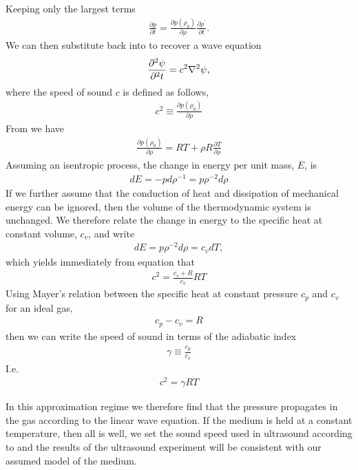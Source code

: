 Keeping only the largest terms
\begin{align}
 \frac{\partial p}{\partial t} = \frac{\partial p(\rho_0)}{\partial \rho} \frac{\partial \rho^\prime}{\partial t}.
\end{align}
We can then substitute back into \eqnref{} to recover a wave equation
\begin{align}
\frac{\partial^2 \psi}{\partial^2 t} = c^2 \nabla^2 \psi,
\end{align}
where the speed of sound $c$ is defined as follows,
\begin{align}
c^2 \equiv \frac{\partial p(\rho_0)}{\partial \rho}
\end{align}
From \eqnref{} we have
\begin{align}
   \frac{\partial p(\rho_0)}{\partial \rho} = RT + \rho R \frac{\partial T}{\partial \rho}
\end{align}
Assuming an isentropic process, the change in energy per unit mass, $E$, is 
\begin{align}
  dE = -pd\rho^{-1} = p \rho^{-2} d\rho
\end{align}
If we further assume that the conduction of heat and dissipation of mechanical energy can be ignored, 
then the volume of the thermodynamic system is unchanged.  
We therefore relate the change in energy to the specific heat at constant volume, $c_v$,  and write
\begin{align}
  dE = p \rho^{-2} d\rho = c_v dT,
\end{align}
which yields immediately from equation \eqnref{} that
\begin{align}
  c^2 = \frac{c_v + R}{c_v}RT
\end{align}
Using Mayer's relation between the specific heat at constant pressure $c_p$ and $c_v$ for an ideal gas,
\begin{align}
  c_p - c_v = R
\end{align}
then we can write the speed of sound in terms of the adiabatic index 
\begin{align}
\gamma \equiv  \frac{c_p}{c_v}
\end{align}
I.e.
\begin{align}
  c^2 = \gamma RT
\end{align}


In this approximation regime we therefore find that the pressure propagates in the gas according to the linear wave equation.
If the medium is held at a constant temperature, then all is well, we set the sound speed used in ultrasound according to \eqnref{} and the results of the 
ultrasound experiment will be consistent with our assumed model of the medium.


